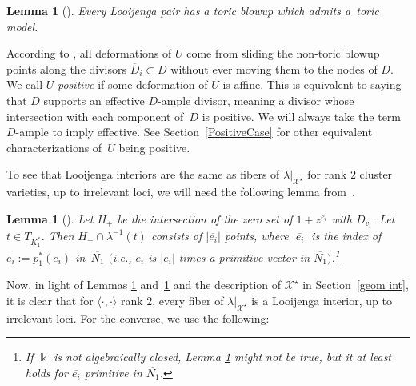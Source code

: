 \documentclass[11pt]{article}
\numberwithin{equation}{section}
\numberwithin{figure}{section}
\numberwithin{table}{section}
\let\?=\overline
\let\s=\mathcal
\newcommand {\kk} {\Bbbk}
\newtheorem{lem}[thm]{Lemma}
\theoremstyle{definition}
\begin{document}
\begin{lem}[{\cite[Proposition~1.19]{GHK1}}]\label{ToricModel} Every Looijenga pair has a toric blowup which admits a~toric model.
\end{lem}

According to \cite{GHK2}, all deformations of $U$ come from sliding the non-toric blowup points along the divisors $\?{D}_i\subset D$ without ever moving them to the nodes of $D$. We call $U$ {\it positive} if some deformation of $U$ is affine. This is equivalent to saying that $D$ supports an effective $D$-ample divisor, meaning a divisor whose intersection with each component of~$D$ is positive. We will always take the term $D$-ample to imply effective. See Section~\ref{PositiveCase} for other equivalent characterizations of~$U$ being positive.

To see that Looijenga interiors are the same as fibers of $\lambda|_{\s{X}^{\star}}$ for rank $2$ cluster varieties, up to irrelevant loci, we will need the following lemma from~\cite{GHK3}.

\begin{lem}[{\cite[Lemma 5.1]{GHK3}}]\label{Fibers}
Let $H_+$ be the intersection of the zero set of $1+z^{e_i}$ with $D_{v_i}$. Let $t\in T_{K_1^*}$. Then $H_+\cap \lambda^{-1}(t)$ consists of $|\?{e_i}|$ points, where $|\?{e_i}|$ is the index of $\?{e_i}:=p_1^*(e_i)$ in~$\?{N_1}$ $($i.e., $\?{e_i}$ is $|\?{e_i}|$ times a primitive vector in $\?{N_1})$.\footnote{If $\kk$ is not algebraically closed, Lemma \ref{Fibers} might not be true, but it at least holds for $\?{e_i}$ primitive in $\?{N_1}$.}
\end{lem}

Now, in light of Lemmas \ref{ToricModel} and~\ref{Fibers} and the description of $\s{X}^{\star}$ in Section~\ref{geom int}, it is clear that for $\langle \cdot,\cdot \rangle$ rank $2$, every fiber of $\lambda|_{\s{X}^{\star}}$ is a Looijenga interior, up to irrelevant loci. For the converse, we use the following:
\end{document}
